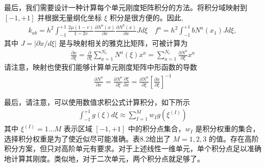 \documentclass[12pt,a4paper]{book}
\begin{document}
最后，我们需要设计一种计算每个单元刚度矩阵积分的方法。将积分域映射到 $[-1,+1]$ 并根据无量纲化坐标 $\xi$ 积分是很方便的。因此,
\begin{equation*}
    \begin{aligned}
        k_{a b}=h^{2} \int_{-1}^{+1} \frac{2 \mu(1-v)}{1-2 v} \frac{\partial N^{a}(x)}{\partial x} \frac{\partial N^{b}(x)}{\partial x} J d \xi \quad f^{a}=h^{2} \int_{-1}^{+1} b N^{a}\left(x_{1}\right) J d \xi,
    \end{aligned}
\end{equation*}
其中 $J=|\partial x/d \xi|$ 是与映射相关的雅克比矩阵，可被计算为
\begin{equation*}
    \begin{aligned}
        \frac{\partial x}{\partial \xi}=\frac{\partial}{\partial \xi} \sum_{a=1}^{N_{e}} N^{a}(\xi) x^{a}=\sum_{a=1}^{N_{e}} \frac{\partial N^{a}}{\partial \xi} x^{a}
    \end{aligned}
\end{equation*}
请注意，映射也使我们能够计算单元刚度矩阵中形函数的导数
\begin{equation*}
    \begin{aligned}
        \frac{\partial N^{a}}{\partial x}=\frac{\partial N^{a}}{\partial \xi} \frac{\partial \xi}{\partial x}=\frac{\partial N^{a}}{\partial \xi}\left[\frac{\partial x}{\partial \xi}\right]^{-1}
    \end{aligned}
\end{equation*}

最后，请注意，可以使用数值求积公式计算积分，如下所示
\begin{equation*}
    \begin{aligned}
        \int_{-1}^{+1} g(\xi) d \xi \approx \sum_{I=1}^{M} w_{I} g\left(\xi^{(I)}\right)
    \end{aligned}
\end{equation*}
其中 $\xi^{(I)} = 1...M$ 表示区域 $[-1,+1]$ 中的积分点集合，$w_I$ 是积分权重的集合，选择积分权重是为了使近似尽可能准确。表8.2给出了 $M = 1,2,3$ 的值。存在高阶积分方案，但只对高阶单元有要求。对于上述线性一维单元，单个积分点足以准确地计算其刚度。类似地，对于二次单元，两个积分点就足够了。

% 







\end{document}
